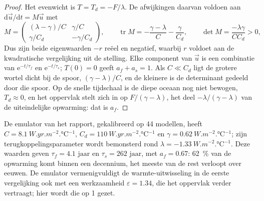 \begin{proof}
Het evenwicht is $T = T_d = -F/\lambda$. De afwijkingen daarvan voldoen aan
$\mathrm d\vec u/\mathrm dt = M\vec u$ met
\[
M = \begin{pmatrix} (\lambda - \gamma)/C & \gamma/C\\ \gamma/C_d &
-\gamma/C_d\end{pmatrix}, \qquad
\operatorname{tr}M = -\frac{\gamma - \lambda}{C} - \frac{\gamma}{C_d},
\qquad \det M = \frac{-\lambda\gamma}{CC_d} > 0 ,
\]
Dus zijn beide eigenwaarden $-r$ reëel en negatief, waarbij $r$ voldoet aan de kwadratische
vergelijking uit de stelling. Elke component van $\vec u$ is een combinatie van $\mathrm
e^{-t/\tau_f}$ en $\mathrm e^{-t/\tau_s}$; $T(0) = 0$ geeft $a_f + a_s =
1$. Als $C \ll C_d$ ligt de grotere wortel dicht bij de spoor, $(\gamma -
\lambda)/C$, en de kleinere is de determinant gedeeld door die spoor. Op de snelle
tijdschaal is de diepe oceaan nog niet bewogen, $T_d \approx 0$, en het oppervlak
stelt zich in op $F/(\gamma - \lambda)$, het deel $-\lambda/(\gamma - \lambda)$
van de uiteindelijke opwarming: dat is $a_f$.
\end{proof}

De emulator van het rapport, gekalibreerd op 44 modellen, heeft $C =
\qty{8.1}{W.yr.m^{-2}.\celsius^{-1}}$, $C_d = \qty{110}{W.yr.m^{-2}.\celsius^{-1}}$
en $\gamma = \qty{0.62}{W.m^{-2}.\celsius^{-1}}$; zijn terugkoppelingsparameter
wordt bemonsterd rond $\lambda = \qty{-1.33}{W.m^{-2}.\celsius^{-1}}$. Deze waarden
geven $\tau_f = \num{4.1}\text{ jaar}$ en $\tau_s = \num{262}\text{ jaar}$, met $a_f =
0.67$: \qty{62}{\percent} van de opwarming komt binnen een decennium, het meeste van de
rest verloopt over eeuwen. De emulator vermenigvuldigt de warmte-uitwisseling in de eerste
vergelijking ook met een werkzaamheid $\varepsilon = 1.34$, die het oppervlak
verder vertraagt; hier wordt die op 1 gezet.

